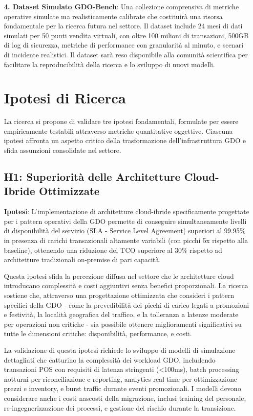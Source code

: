 \textbf{4. Dataset Simulato GDO-Bench}: Una collezione comprensiva di metriche operative simulate ma realisticamente calibrate che costituirà una risorsa fondamentale per la ricerca futura nel settore. Il dataset include 24 mesi di dati simulati per 50 punti vendita virtuali, con oltre 100 milioni di transazioni, 500GB di log di sicurezza, metriche di performance con granularità al minuto, e scenari di incidente realistici. Il dataset sarà reso disponibile alla comunità scientifica per facilitare la reproducibilità della ricerca e lo sviluppo di nuovi modelli.

\section{Ipotesi di Ricerca}

La ricerca si propone di validare tre ipotesi fondamentali, formulate per essere empiricamente testabili attraverso metriche quantitative oggettive. Ciascuna ipotesi affronta un aspetto critico della trasformazione dell'infrastruttura GDO e sfida assunzioni consolidate nel settore.

\subsection{H1: Superiorità delle Architetture Cloud-Ibride Ottimizzate}

\textbf{Ipotesi}: L'implementazione di architetture cloud-ibride specificamente progettate per i pattern operativi della GDO permette di conseguire simultaneamente livelli di disponibilità del servizio (SLA - Service Level Agreement) superiori al 99.95\% in presenza di carichi transazionali altamente variabili (con picchi 5x rispetto alla baseline), ottenendo una riduzione del TCO superiore al 30\% rispetto ad architetture tradizionali on-premise di pari capacità.

Questa ipotesi sfida la percezione diffusa nel settore che le architetture cloud introducano complessità e costi aggiuntivi senza benefici proporzionali. La ricerca sostiene che, attraverso una progettazione ottimizzata che consideri i pattern specifici della GDO - come la prevedibilità dei picchi di carico legati a promozioni e festività, la località geografica del traffico, e la tolleranza a latenze moderate per operazioni non critiche - sia possibile ottenere miglioramenti significativi su tutte le dimensioni critiche: disponibilità, performance, e costi.

La validazione di questa ipotesi richiede lo sviluppo di modelli di simulazione dettagliati che catturino la complessità dei workload GDO, includendo transazioni POS con requisiti di latenza stringenti (<100ms), batch processing notturni per riconciliazione e reporting, analytics real-time per ottimizzazione prezzi e inventory, e burst traffic durante eventi promozionali. I modelli devono considerare anche i costi nascosti della migrazione, inclusi training del personale, re-ingegnerizzazione dei processi, e gestione del rischio durante la transizione.


